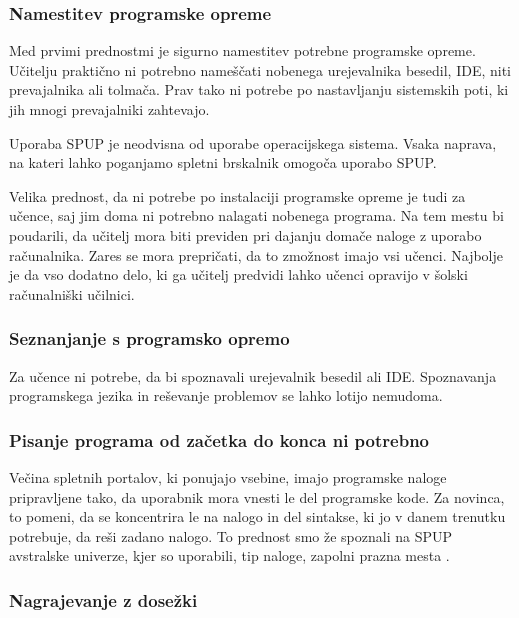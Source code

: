 \subsubsection{Namestitev programske opreme}
\label{sec:Namestitev_programske_opreme}

Med prvimi prednostmi je sigurno namestitev potrebne programske
opreme. Učitelju praktično ni potrebno nameščati nobenega urejevalnika
besedil, IDE, niti prevajalnika ali tolmača. Prav tako ni potrebe po
nastavljanju sistemskih poti, ki jih mnogi prevajalniki zahtevajo.

Uporaba SPUP je neodvisna od uporabe operacijskega sistema. Vsaka
naprava, na kateri lahko poganjamo spletni brskalnik omogoča uporabo
SPUP.

Velika prednost, da ni potrebe po instalaciji programske opreme je
tudi za učence, saj jim doma ni potrebno nalagati nobenega
programa. Na tem mestu bi poudarili, da učitelj mora biti previden pri
dajanju domače naloge z uporabo računalnika. Zares se mora prepričati,
da to zmožnost imajo vsi učenci. Najbolje je da vso dodatno delo, ki
ga učitelj predvidi lahko učenci opravijo v šolski računalniški
učilnici.

\subsubsection{Seznanjanje s programsko opremo}
\label{sec:Seznanjanje_s_prog_opremo}

Za učence ni potrebe, da bi spoznavali urejevalnik besedil ali
IDE. Spoznavanja programskega jezika in reševanje problemov se lahko
lotijo nemudoma.


\subsubsection{Pisanje programa od začetka do konca ni potrebno}
\label{sec:pisanj_celega_progama}

Večina spletnih portalov, ki ponujajo vsebine, imajo programske naloge
pripravljene tako, da uporabnik mora vnesti le del programske kode. Za
novinca, to pomeni, da se koncentrira le na nalogo in del sintakse, ki
jo v danem trenutku potrebuje, da reši zadano nalogo. To prednost smo
že spoznali na SPUP avstralske univerze, kjer so uporabili, tip
naloge, zapolni prazna mesta \cite{thesisAWebP}.

\subsubsection{Nagrajevanje z dosežki}
\label{sec:nagrajevanje_s_dos}






